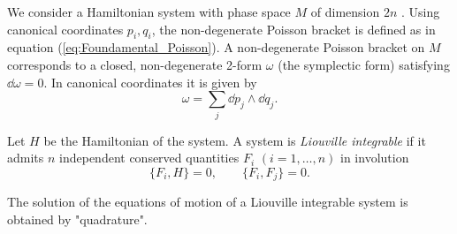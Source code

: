 We consider a Hamiltonian system with phase space $M$ of dimension $2n$ \cite{babelon2003introduction,perelomov1990integrable}.  
Using canonical coordinates $p_i, q_i$, the non-degenerate Poisson bracket is defined as in equation (\ref{eq:Foundamental_Poisson}).  
A non-degenerate Poisson bracket on $M$ corresponds to a closed, non-degenerate 2-form $\omega$ (the symplectic form) satisfying $\dd \omega = 0$.  
In canonical coordinates it is given by
\begin{equation}
    \omega = \sum_j \dd p_j \wedge \dd q_j.
\end{equation}
\begin{definition}
    Let $H$ be the Hamiltonian of the system. A system is \emph{Liouville integrable} if it admits $n$ independent conserved quantities $F_i$ $(i = 1, \dots, n)$ in involution
    \begin{equation}
        \{F_i, H\} = 0, \qquad \{F_i, F_j\} = 0.
    \end{equation}
\end{definition}

\begin{theorem}
     The solution of the equations of motion of a Liouville integrable system is obtained by "quadrature".
\end{theorem}


